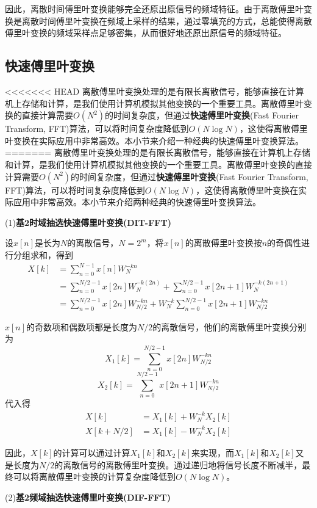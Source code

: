 因此，离散时间傅里叶变换能够完全还原出原信号的频域特征。由于离散傅里叶变换是离散时间傅里叶变换在频域上采样的结果，通过零填充的方式，总能使得离散傅里叶变换的频域采样点足够密集，从而很好地还原出原信号的频域特征。

\subsection{快速傅里叶变换}\label{sub:FFT}

<<<<<<< HEAD
离散傅里叶变换处理的是有限长离散信号，能够直接在计算机上存储和计算，是我们使用计算机模拟其他变换的一个重要工具。离散傅里叶变换的直接计算需要$O(N^2)$的时间复杂度，但通过\textbf{快速傅里叶变换}(Fast Fourier Transform, FFT)算法，可以将时间复杂度降低到$O(N\log N)$，这使得离散傅里叶变换在实际应用中非常高效。本小节来介绍一种经典的快速傅里叶变换算法。
=======
离散傅里叶变换处理的是有限长离散信号，能够直接在计算机上存储和计算，是我们使用计算机模拟其他变换的一个重要工具。离散傅里叶变换的直接计算需要$O(N^2)$的时间复杂度，但通过\textbf{快速傅里叶变换}(Fast Fourier Transform, FFT)算法，可以将时间复杂度降低到$O(N\log N)$，这使得离散傅里叶变换在实际应用中非常高效。本小节来介绍两种经典的快速傅里叶变换算法。

(1)\textbf{基2时域抽选快速傅里叶变换(DIT-FFT)}

设$x[n]$是长为$N$的离散信号，$N=2^m$，将$x[n]$的离散傅里叶变换按$n$的奇偶性进行分组求和，得到
\begin{align*}
X[k]&=\sum_{n=0}^{N-1}x[n]W_N^{-kn}\\
&=\sum_{n=0}^{N/2-1}x[2n]W_N^{-k(2n)}+\sum_{n=0}^{N/2-1}x[2n+1]W_N^{-k(2n+1)}\\
&=\sum_{n=0}^{N/2-1}x[2n]W_{N/2}^{-kn}+W_N^{-k}\sum_{n=0}^{N/2-1}x[2n+1]W_{N/2}^{-kn}
\end{align*}

$x[n]$的奇数项和偶数项都是长度为$N/2$的离散信号，他们的离散傅里叶变换分别为$$X_1[k]=\sum_{n=0}^{N/2-1}x[2n]W_{N/2}^{-kn}$$
$$X_2[k]=\sum_{n=0}^{N/2-1}x[2n+1]W_{N/2}^{-kn}$$
代入得
\begin{align*}
X[k]&=X_1[k]+W_N^{-k}X_2[k]\\
X[k+N/2]&=X_1[k]-W_N^{-k}X_2[k]
\end{align*}

因此，$X[k]$的计算可以通过计算$X_1[k]$和$X_2[k]$来实现，而$X_1[k]$和$X_2[k]$又是长度为$N/2$的离散信号的离散傅里叶变换。通过递归地将信号长度不断减半，最终可以将离散傅里叶变换的计算复杂度降低到$O(N\log N)$。

(2)\textbf{基2频域抽选快速傅里叶变换(DIF-FFT)}

